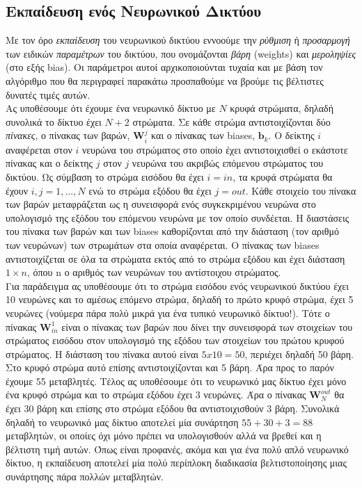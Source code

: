 \documentclass[11pt]{article} %
\numberwithin{equation}{subsection}
\begin{document}
\subsection{Εκπαίδευση ενός Νευρωνικού Δικτύου}
Με τον όρο \textit{εκπαίδευση} του νευρωνικού δικτύου εννοούμε την \textit{ρύθμιση} ή \textit{προσαρμογή} των ειδικών \textit{παραμέτρων} του δικτύου, που ονομάζονται \textit{βάρη} (weights) και \textit{μεροληψίες} (στο εξής bias). Οι παράμετροι αυτοί αρχικοποιούνται τυχαία και με βάση τον αλγόριθμο που θα περιγραφεί παρακάτω προσπαθούμε να βρούμε τις βέλτιστες δυνατές τιμές αυτών.\\

Ας υποθέσουμε ότι έχουμε ένα νευρωνικό δίκτυο με $N$ κρυφά στρώματα, δηλαδή συνολικά το δίκτυο έχει $N+2$ στρώματα. Σε κάθε στρώμα αντιστοιχίζονται δύο \textit{πίνακες}, ο πίνακας των βαρών, $\textbf{W}_i ^j$ και ο πίνακας των biases, $\textbf{b}_k$. Ο δείκτης $i$ αναφέρεται στον $i$ νευρώνα του στρώματος στο οποίο έχει αντιστοιχισθεί ο εκάστοτε πίνακας και ο δείκτης $j$ στον $j$ νευρώνα του ακριβώς επόμενου στρώματος του δικτύου. Ως σύμβαση το στρώμα εισόδου θα έχει $i = in$,  τα κρυφά στρώματα θα έχουν $i,j = 1, \dots , N$ ενώ το στρώμα εξόδου θα έχει $j=out$. Κάθε στοιχείο του πίνακα των βαρών μεταφράζεται ως η συνεισφορά ενός συγκεκριμένου νευρώνα στο υπολογισμό της εξόδου του επόμενου νευρώνα με τον οποίο συνδέεται. Η διαστάσεις του πίνακα των βαρών και των biases καθορίζονται από την διάσταση (τον αριθμό των νευρώνων) των στρωμάτων στα οποία αναφέρεται. Ο πίνακας των biases αντιστοιχίζεται σε όλα τα στρώματα εκτός από το στρώμα εξόδου και έχει διάσταση $1 \times n$, όπου n ο αριθμός των νευρώνων του αντίστοιχου στρώματος. \\

Για παράδειγμα ας υποθέσουμε ότι το στρώμα εισόδου ενός νευρωνικού δικτύου έχει 10 νευρώνες και το αμέσως επόμενο στρώμα, δηλαδή το πρώτο κρυφό στρώμα, έχει 5 νευρώνες (νούμερα πάρα πολύ μικρά για ένα τυπικό νευρωνικό δίκτυο!). Τότε ο πίνακας  $\textbf{W}_{in} ^1$ είναι ο πίνακας των βαρών που δίνει την συνεισφορά των στοιχείων του στρώματος εισόδου στον υπολογισμό της εξόδου των στοιχείων του πρώτου κρυφού στρώματος. Η διάσταση του πίνακα αυτού είναι $5 x 10 = 50$, περιέχει δηλαδή 50 βάρη. Στο κρυφό στρώμα αυτό επίσης αντιστοιχίζονται και 5 βάρη. Άρα προς το παρόν έχουμε 55 μεταβλητές. Τέλος ας υποθέσουμε ότι το νευρωνικό μας δίκτυο έχει μόνο ένα κρυφό στρώμα και το στρώμα εξόδου έχει 3 νευρώνες. Άρα ο πίνακας $\textbf{W}_{N} ^{out}$ θα έχει 30 βάρη και επίσης στο στρώμα εξόδου θα αντιστοιχισθούν 3 βάρη. Συνολικά δηλαδή το νευρωνικό μας δίκτυο αποτελεί μία συνάρτηση $55 + 30 + 3 = 88$ μεταβλητών, οι οποίες όχι μόνο πρέπει να υπολογισθούν αλλά να βρεθεί και η βέλτιστη τιμή αυτών. Όπως είναι προφανές, ακόμα και για ένα πολύ απλό νευρωνικό δίκτυο, η εκπαίδευση αποτελεί μία πολύ περίπλοκη διαδικασία βελτιστοποίησης μιας συνάρτησης πάρα πολλών μεταβλητών. \\
\end{document}
